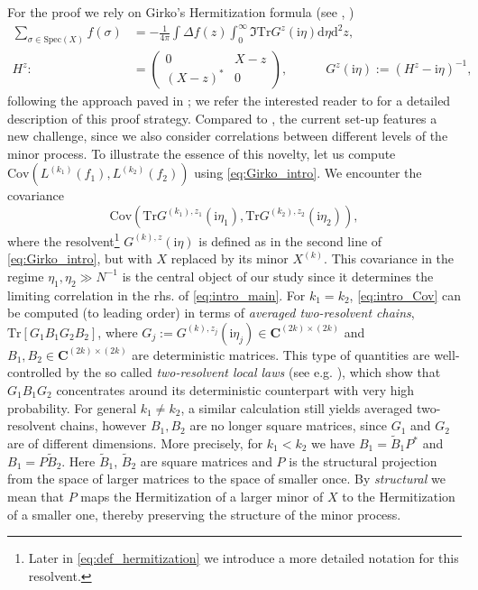 \documentclass[10pt]{amsart}
\numberwithin{equation}{section}
\newcommand{\dif}{\mathrm{d}}
\newcommand{\C}{\mathbf{C}}
\newcommand{\Cov}{\mathrm{Cov}}
\newcommand{\ii}{\mathrm{i}}
\begin{document}
   
For the proof we rely on Girko's Hermitization formula (see \cite{Girko84}, \cite{TaoVu15})
\begin{equation}
\begin{split}
\sum_{\sigma\in\mathrm{Spec}(X)}f(\sigma)&=-\frac{1}{4\pi}\int\Delta f(z)\int_0^\infty \Im \mathrm{Tr} G^z(\ii\eta)\dif \eta\dif^2z, \\
H^z:&=\left(\begin{matrix}
0 & X-z \\
(X-z)^* & 0
\end{matrix}\right), \qquad\quad G^z(\ii\eta):=(H^z-\ii\eta)^{-1},
\end{split}
\label{eq:Girko_intro}
\end{equation}
following the approach paved in \cite{macroCLT_complex}; we refer the interested reader to \cite[Section~3]{macroCLT_complex} for a detailed description of this proof strategy. Compared to \cite{macroCLT_complex}, the current set-up features a new challenge, since we also consider correlations between different levels of the minor process. To illustrate the essence of this novelty, let us compute $\Cov\left(L^{(k_1)}(f_1), L^{(k_2)}(f_2)\right)$ using \eqref{eq:Girko_intro}. We encounter the covariance
\begin{equation}
\Cov\left(\mathrm{Tr} G^{(k_1),z_1}(\ii\eta_1),\mathrm{Tr} G^{(k_2),z_2}(\ii\eta_2)\right),
\label{eq:intro_Cov}
\end{equation}
where the resolvent\footnote{Later in \eqref{eq:def_hermitization} we introduce a more detailed notation for this resolvent.} $G^{(k),z}(\ii\eta)$ is defined as in the second line of \eqref{eq:Girko_intro}, but with $X$ replaced by its minor $X^{(k)}$. This covariance in the regime $\eta_1,\eta_2\gg N^{-1}$ is the central object of our study since it determines the limiting correlation in the rhs. of \eqref{eq:intro_main}. For $k_1=k_2$, \eqref{eq:intro_Cov} can be computed (to leading order) in terms of \emph{averaged two-resolvent chains}, $\mathrm{Tr} [G_1B_1G_2B_2]$, where $G_j:=G^{(k),z_j}(\ii\eta_j)\in\C^{(2k)\times (2k)}$ and $B_1,B_2\in\C^{(2k)\times (2k)}$ are deterministic matrices. This type of quantities are well-controlled by the so called \emph{two-resolvent local laws} (see e.g. \cite{Multi_res_llaws}), which show that $G_1B_1G_2$ concentrates around its deterministic counterpart with very high probability. For general $k_1\neq k_2$, a similar calculation still yields averaged two-resolvent  chains, however $B_1,B_2$ are no longer square matrices, since $G_1$ and $G_2$ are of different dimensions. More precisely, for $k_1<k_2$ we have $B_1=\widetilde{B}_1P^*$ and $B_1=P\widetilde{B}_2$. Here $\widetilde{B}_1$, $\widetilde{B}_2$ are square matrices and $P$ is the structural projection from the space of larger matrices to the space of smaller once. By \emph{structural} we mean that $P$ maps the Hermitization of a larger minor of $X$ to the Hermitization of a smaller one, thereby preserving the structure of the minor process.
\end{document}
